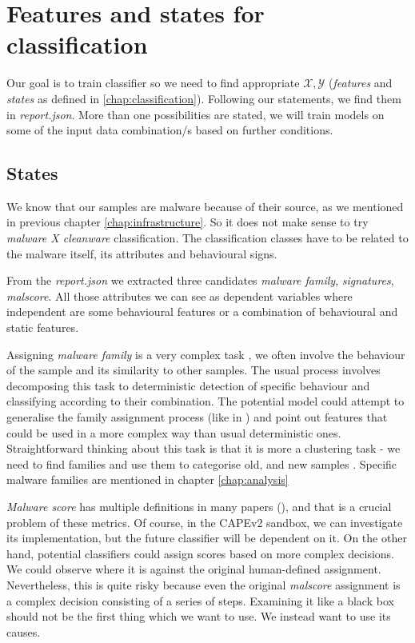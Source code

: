 \section{Features and states for classification}
Our goal is to train classifier so we need to find appropriate $\mathcal{X}, \mathcal{Y}$ (\emph{features} and \emph{states} as defined in \ref{chap:classification}). Following our statements, we find them in \emph{report.json}. More than one possibilities are stated, we will train models on some of the input data combination/s  based on further conditions.

\subsection{States}
We know that our samples are malware because of their source, as we mentioned in previous chapter \ref{chap:infrastructure}. So it does not make sense to try \emph{malware X cleanware} classification. The classification classes have to be related to the malware itself, its attributes and behavioural signs.

From the \emph{report.json} we extracted three candidates \emph{malware family}, \emph{signatures}, \emph{malscore}. All those attributes we can see as dependent variables where independent are some behavioural features or a combination of behavioural and static features. 

Assigning \emph{malware family} is a very complex task \cite{Gennari2011}, we often involve the behaviour of the sample and its similarity to other samples. The usual process involves decomposing this task to deterministic detection of specific behaviour and classifying according to their combination. The potential model could attempt to generalise the family assignment process (like in \cite{Rieck2008}) and point out features that could be used in a more complex way than usual deterministic ones. Straightforward thinking about this task is that it is more a clustering task - we need to find families and use them to categorise old, and new samples \cite{Pitolli2017}. Specific malware families are mentioned in chapter \ref{chap:analysis}

\emph{Malware score} has multiple definitions in many papers (\cite{Walker2019, Kumar2014}), and that is a crucial problem of these metrics. Of course, in the CAPEv2 sandbox, we can investigate its implementation, but the future classifier will be dependent on it. On the other hand, potential classifiers could assign scores based on more complex decisions. We could observe where it is against the original human-defined assignment. Nevertheless, this is quite risky because even the original \emph{malscore} assignment is a complex decision consisting of a series of steps. Examining it like a black box should not be the first thing which we want to use. We instead want to use its causes.

